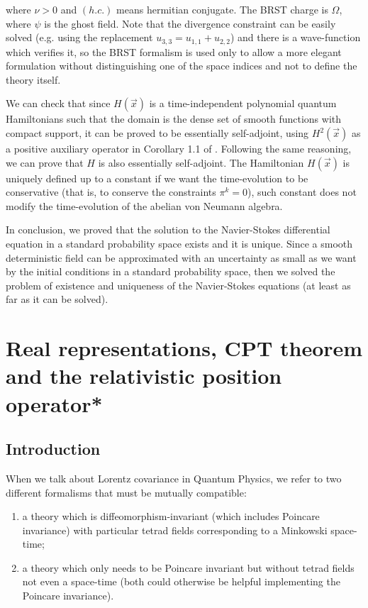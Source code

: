 \documentclass[11pt]{book}
\begin{document}
where \(\nu>0\) and \((h.c.)\) means hermitian conjugate. The BRST
charge is \(\Omega\), where \(\psi\) is the ghost field. Note that the
divergence constraint can be easily solved (e.g. using the replacement
\(u_{3,3}=u_{1,1}+u_{2,2}\)) and there is a wave-function which verifies
it, so the BRST formalism is used only to allow a more elegant
formulation without distinguishing one of the space indices and not to
define the theory itself.

We can check that since \(H(\vec{x})\) is a time-independent polynomial
quantum Hamiltonians such that the domain is the dense set of smooth
functions with compact support, it can be proved to be essentially
self-adjoint\cite{cmpux2f1103859517}\cite{faris2006self}, using \(H^2(\vec{x})\) as a positive auxiliary operator
in Corollary 1.1 of \cite{cmpux2f1103859517}. Following the same reasoning, we can prove
that \(H\) is also essentially self-adjoint. The Hamiltonian
\(H(\vec{x})\) is uniquely defined up to a constant if we want the
time-evolution to be conservative (that is, to conserve the constraints
\(\pi^k=0\)), such constant does not modify the time-evolution of the
abelian von Neumann algebra.

In conclusion, we proved that the solution to the Navier-Stokes
differential equation in a standard probability space exists and it is
unique. Since a smooth deterministic field can be approximated with an
uncertainty as small as we want by the initial conditions in a standard
probability space, then we solved the problem of existence and
uniqueness of the Navier-Stokes equations (at least as far as it can be
solved).

\chapter{Real representations, CPT theorem and the relativistic position operator*}
\cite{Renou_2021}

\hypertarget{intro}{%
\section{Introduction}\label{intro}}

When we talk about Lorentz covariance in Quantum Physics, we refer to
two different formalisms that must be mutually compatible:

\begin{enumerate}
\item
  a theory which is diffeomorphism-invariant (which includes Poincare
  invariance) with particular tetrad fields corresponding to a Minkowski
  space-time;
\item
  a theory which only needs to be Poincare invariant but without tetrad
  fields not even a space-time (both could otherwise be helpful
  implementing the Poincare invariance).
\end{enumerate}
\end{document}
